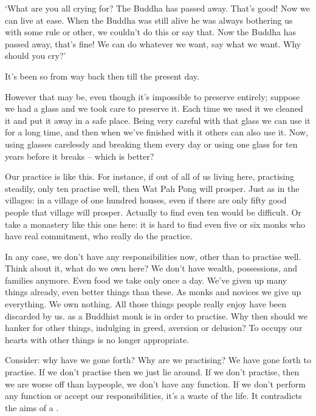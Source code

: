 `What are you all crying for? The Buddha has passed away. That's good! Now we can live at ease. When the Buddha was still alive he was always bothering us with some rule or other, we couldn't do this or say that. Now the Buddha has passed away, that's fine! We can do whatever we want, say what we want. Why should you cry?' 

It's been so from way back then till the present day. 

However that may be, even though it's impossible to preserve entirely; suppose we had a glass and we took care to preserve it. Each time we used it we cleaned it and put it away in a safe place. Being very careful with that glass we can use it for a long time, and then when we've finished with it others can also use it. Now, using glasses carelessly and breaking them every day or using one glass for ten years before it breaks -- which is better? 

Our practice is like this. For instance, if out of all of us living here, practising steadily, only ten practise well, then Wat Pah Pong will prosper. Just as in the villages: in a village of one hundred houses, even if there are only fifty good people that village will prosper. Actually to find even ten would be difficult. Or take a monastery like this one here: it is hard to find even five or six monks who have real commitment, who really do the practice. 

In any case, we don't have any responsibilities now, other than to practise well. Think about it, what do we own here? We don't have wealth, possessions, and families anymore. Even food we take only once a day. We've given up many things already, even better things than these. As monks and novices we give up everything. We own nothing. All those things people really enjoy have been discarded by us.  as a Buddhist monk is in order to practise. Why then should we hanker for other things, indulging in greed, aversion or delusion? To occupy our hearts with other things is no longer appropriate. 

Consider: why have we gone forth? Why are we practising? We have gone forth to practise. If we don't practise then we just lie around. If we don't practise, then we are worse off than laypeople, we don't have any function. If we don't perform any function or accept our responsibilities, it's a waste of the  life. It contradicts the aims of a . 

